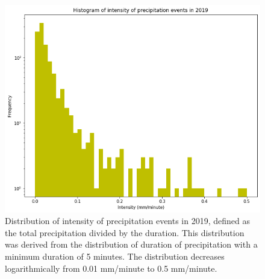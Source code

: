 %

\begin{figure}[h]
\centering
\includegraphics[width=150mm]{../Figures/intensity_hist_5min.png}
\caption{\label{abc}Distribution of intensity of precipitation events in 2019,
defined as the total precipitation divided by the duration. This
distribution was derived from the distribution of duration of
precipitation with a minimum duration of 5 minutes. The distribution
decreases logarithmically from 0.01 mm/minute to 0.5 mm/minute.} 
\end{figure}
\vfill
